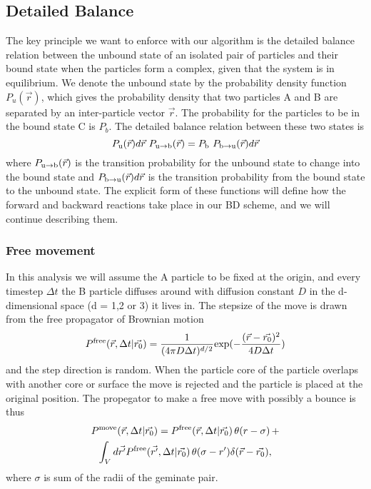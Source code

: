 \subsection{Detailed Balance}

The key principle we want to enforce with our algorithm is the detailed balance relation between the unbound state of an isolated pair of particles and their bound state when the particles form a complex, given that the system is in equilibrium. We denote the unbound state by the probability density function $P_u(\vec{r})$, which gives the probability density that two particles A and B are separated by an inter-particle vector $\vec{r}$. The probability for the particles to be in the bound state C is $P_b$. The detailed balance relation between these two states is
\begin{equation}
 P_{ \rm{u} }(\vec{r})d\vec{r} \,\, P_{ \rm{u} \rightarrow \rm{b} }(\vec{r}) = P_{ \rm{b} } \,\, P_{ \rm{b} \rightarrow \rm{u} }(\vec{r})d\vec{r}
\label{DBeqn}
\end{equation}
where $P_{ \rm{u} \rightarrow \rm{b} }(\vec{r})$ is the transition probability for the unbound state to change into the bound state and $P_{ \rm{b} \rightarrow \rm{u}}(\vec{r})d\vec{r}$ is the transition probability from the bound state to the unbound state. The explicit form of these functions will define how the forward and backward reactions take place in our BD scheme, and we will continue describing them. 

\subsubsection{Free movement}

In this analysis we will assume the A particle to be fixed at the origin, and every timestep $\Delta t$ the B particle diffuses around with diffusion constant $D$ in the d-dimensional space (d = 1,2 or 3) it lives in. The stepsize of the move is drawn from the free propagator of Brownian motion 
\begin{equation}
P^{\rm free}(\vec{r},\Delta t|\vec{r_0}) = \frac{1}{(4 \pi D \Delta t)^{d/2}}{\rm exp}(-\frac{(\vec{r}-\vec{r_0})^2}{4 D \Delta t}) 
\end{equation}
and the step direction is random. When the particle core of the particle overlaps with another core or surface the move is rejected and the particle is placed at the original position. The propegator to make a free move with possibly a bounce is thus
\begin{multline}
 P^{\rm move}(\vec{r},\Delta t|\vec{r_0}) = P^{\rm free}(\vec{r},\Delta t|\vec{r_0}) \, \theta(r - \sigma) \, + \\ \int_{V} d\vec{r'}P^{\rm free}(\vec{r'},\Delta t|\vec{r_0}) \, \theta(\sigma - r')\delta(\vec{r}-\vec{r_0}),
\label{move_prop}
\end{multline}
where $\sigma$ is sum of the radii of the geminate pair. 

